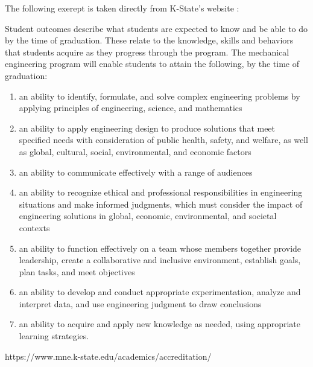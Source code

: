 The following exerept is taken directly from K-State's website \cite{abet}:

Student outcomes describe what students are expected to know and be 
able to do by the time of graduation. These relate to the knowledge, 
skills and behaviors that students acquire as they progress through 
the program. The mechanical engineering program will enable students 
to attain the following, by the time of graduation:
\begin{enumerate}
    \item an ability to identify, formulate, and solve complex engineering problems by applying principles of engineering, science, and mathematics
    \item an ability to apply engineering design to produce solutions that meet specified needs with consideration of public health, safety, and welfare, as well as global, cultural, social, environmental, and economic factors
    \item an ability to communicate effectively with a range of audiences
    \item an ability to recognize ethical and professional responsibilities in engineering situations and make informed judgments, which must consider the impact of engineering solutions in global, economic, environmental, and societal contexts
    \item an ability to function effectively on a team whose members together provide leadership, create a collaborative and inclusive environment, establish goals, plan tasks, and meet objectives
    \item an ability to develop and conduct appropriate experimentation, analyze and interpret data, and use engineering judgment to draw conclusions
    \item an ability to acquire and apply new knowledge as needed, using appropriate learning strategies.
\end{enumerate}

https://www.mne.k-state.edu/academics/accreditation/